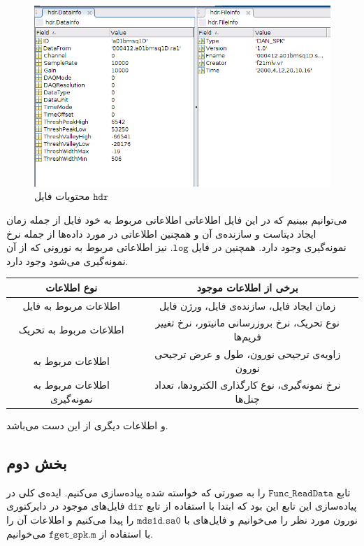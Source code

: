 \documentclass[12pt,onecolumn,a4paper,fleqn]{article}
\newcommand{\pf}[1]{$\mathtt{#1}$}
\begin{document}
	\begin{figure}[h]
		\centering
		\includegraphics[trim=0.2cm 1cm 0 0.2cm ,clip=true, width=0.8\linewidth]{photos/hdr.png}
		\caption{محتویات فایل \pf{hdr}}
	\end{figure}

می‌توانیم ببینیم که در این فایل اطلاعاتی اطلاعاتی مربوط به خود فایل از جمله‌ زمان ایجاد دیتاست و سازنده‌ی آن و همچنین اطلاعاتی در مورد داده‌ها از جمله نرخ نمونه‌‌گیری وجود دارد.
همچنین در فایل 
\pf{.log} نیز اطلاعاتی مربوط به نورونی که از آن نمونه‌گیری می‌شود وجود دارد.

\begin{table}[h]
	\centering
	\begin{tabular}{|c|c|}
		\hline
		نوع اطلاعات            & برخی از اطلاعات موجود                                \\ \hline
		اطلاعات مربوط به فایل  & زمان ایجاد فایل، سازنده‌ی فایل، ورژن فایل            \\ \hline
		اطلاعات مربوط به تحریک & نوع تحریک، نرخ‌ بروزرسانی مانیتور، نرخ تغییر فریم‌ها \\ \hline
		اطلاعات مربوط به \lr{tuning curve} & زاویه‌‌ی ترجیحی نورون، طول و عرض ترجیحی نورون \\ 
		\hline
				اطلاعات مربوط به نمونه‌‌گیری  & نرخ نمونه‌‌گیری، نوع  کارگذاری الکترود‌ها،  تعداد چنل‌ها         \\ \hline
	\end{tabular}
\end{table}

و اطلاعات دیگری از این دست می‌باشد.

\subsection{بخش دوم}
تابع \pf{Func\_ReadData} را به صورتی که خواسته شده پیاده‌سازی می‌کنیم. ایده‌ی کلی در پیاده‌سازی این تابع این بود که ابتدا با استفاده از تابع \pf{dir} فایل‌های موجود در دایرکتوری نورون مورد نظر را می‌خوانیم و فایل‌های با
\pf{mds1d.sa0}
را پیدا می‌کنیم و اطلاعات آن را با استفاده از 
		\pf{fget\_spk.m}
		می‌خوانیم.
		
\end{document}

